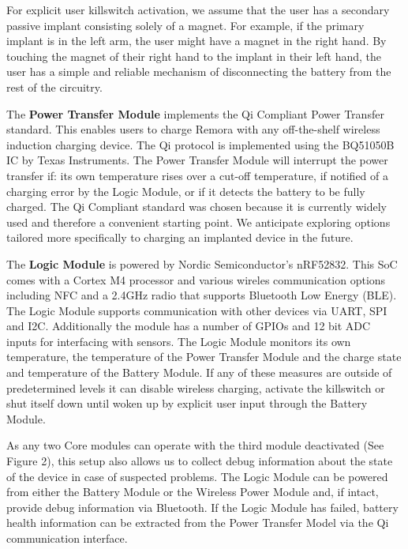 \documentclass[runningheads,a4paper]{llncs}
\begin{document}
For explicit user killswitch activation, we assume that the user has a secondary passive implant consisting solely of a magnet. For example, if the primary implant is in the left arm, the user might have a magnet in the right hand. By touching the magnet of their right hand to the implant in their left hand, the user has a simple and reliable mechanism of disconnecting the battery from the rest of the circuitry.

The \textbf{Power Transfer Module} implements the Qi Compliant Power Transfer standard. This enables users to charge Remora with any off-the-shelf wireless induction charging device. The Qi protocol is implemented using the BQ51050B IC by Texas Instruments. The Power Transfer Module will interrupt the power transfer if: its own temperature rises over a cut-off temperature, if notified of a charging error by the Logic Module, or if it detects the battery to be fully charged. The Qi Compliant standard was chosen because it is currently widely used and therefore a convenient starting point. We anticipate exploring options tailored more specifically to charging an implanted device in the future.

The \textbf{Logic Module} is powered by Nordic Semiconductor's nRF52832. This SoC comes with a Cortex M4 processor and various wireles communication options including NFC and a 2.4GHz radio that supports Bluetooth Low Energy (BLE). The Logic Module supports communication with other devices via UART, SPI and I2C. Additionally the module has a number of GPIOs and 12 bit ADC inputs for interfacing with sensors. The Logic Module monitors its own temperature, the temperature of the Power Transfer Module and the charge state and temperature of the Battery Module. If any of these measures are outside of predetermined levels it can disable wireless charging, activate the killswitch or shut itself down until woken up by explicit user input through the Battery Module.

As any two Core modules can operate with the third module deactivated (See Figure 2), this setup also allows us to collect debug information about the state of the device in case of suspected problems. The Logic Module can be powered from either the Battery Module or the Wireless Power Module and, if intact, provide debug information via Bluetooth. If the Logic Module has failed, battery health information can be extracted from the Power Transfer Model via the Qi communication interface.  
\end{document}
